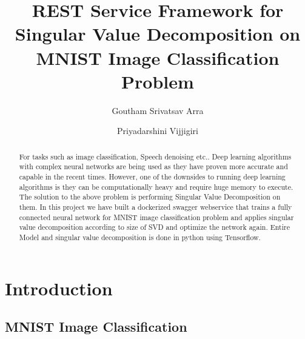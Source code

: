 
\title{REST Service Framework for Singular Value Decomposition on MNIST Image Classification Problem}


\author{Goutham Srivatsav Arra}

\author{Priyadarshini Vijjigiri}

\renewcommand{\shortauthors}{G. v. Laszewski}


\begin{abstract} 

For tasks such as image classification, Speech denoising etc.. Deep learning
algorithms with complex  neural networks are being used as they have proven
more accurate and capable in the recent times. However, one of the downsides
to running deep learning algorithms is they can be computationally heavy and
require huge memory to execute. The solution to  the above problem is
performing Singular Value Decomposition on them. In this project we have built
a dockerized swagger webservice  that trains a fully connected neural network
for MNIST image classification problem and applies singular value
decomposition according to size of SVD and optimize the network again. Entire
Model and singular value decomposition is done in  python using Tensorflow.

 \end{abstract}



\maketitle



\section{Introduction}

\subsection{MNIST Image Classification}


